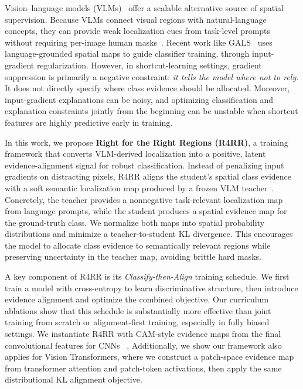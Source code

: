 Vision--language models (VLMs)~\cite{lin2023clip} offer a scalable alternative source of spatial supervision. Because VLMs connect visual regions with natural-language concepts, they can provide weak localization cues from task-level prompts without requiring per-image human masks~\cite{elhoseiny2013write, frome2013devise, lampert2013attribute, le2020using, radford2021learning}. Recent work like GALS~\cite{petryk2022guiding} uses language-grounded spatial maps to guide classifier training, through input-gradient regularization. However, in shortcut-learning settings, gradient suppression is primarily a negative constraint: \textit{it tells the model where not to rely}. It does not directly specify where class evidence should be allocated. Moreover, input-gradient explanations can be noisy, and optimizing classification and explanation constraints jointly from the beginning can be unstable when shortcut features are highly predictive early in training.

In this work, we propose \textbf{Right for the Right Regions (R4RR)}, a training framework that converts VLM-derived localization into a positive, latent evidence-alignment signal for robust classification. Instead of penalizing input gradients on distracting pixels, R4RR aligns the student's spatial class evidence with a soft semantic localization map produced by a frozen VLM teacher~\cite{zhang2025frozen}. Concretely, the teacher provides a nonnegative task-relevant localization map from language prompts, while the student produces a spatial evidence map for the ground-truth class. We normalize both maps into spatial probability distributions and minimize a teacher-to-student KL divergence. This encourages the model to allocate class evidence to semantically relevant regions while preserving uncertainty in the teacher map, avoiding brittle hard masks.

A key component of R4RR is its \emph{Classify-then-Align} training schedule. We first train a model with cross-entropy to learn discriminative structure, then introduce evidence alignment and optimize the combined objective. Our curriculum ablations show that this schedule is substantially more effective than joint training from scratch or alignment-first training, especially in fully biased settings. We instantiate R4RR with CAM-style evidence maps from the final convolutional features for CNNs ~\cite{zhou2016learning}. Additionally, we show our framework also applies for Vision Transformers, where we construct a patch-space evidence map from transformer attention and patch-token activations, then apply the same distributional KL alignment objective.

